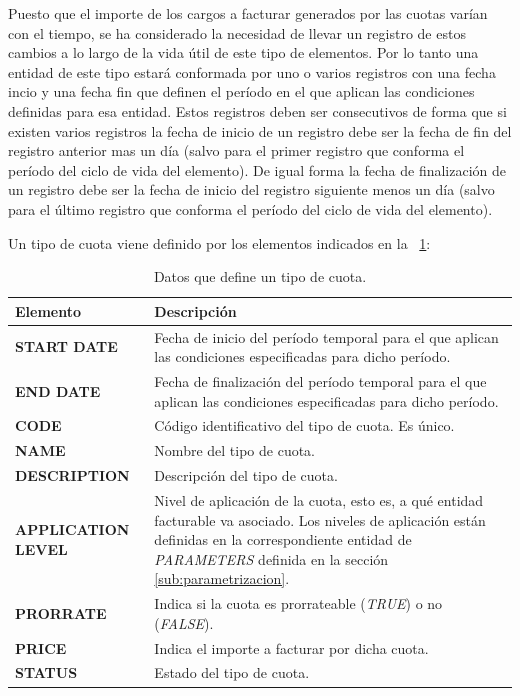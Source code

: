 Puesto que el importe de los cargos a facturar generados por las cuotas varían con el tiempo, se ha considerado la necesidad de llevar un registro de estos cambios a lo largo de la vida útil de este tipo de elementos. Por lo tanto una entidad de este tipo estará conformada por uno o varios registros con una fecha incio y una fecha fin que definen el período en el que aplican las condiciones definidas para esa entidad. Estos registros deben ser consecutivos de forma que si existen varios registros la fecha de inicio de un registro debe ser la fecha de fin del registro anterior mas un día (salvo para el primer registro que conforma el período del ciclo de vida del elemento). De igual forma la fecha de finalización de un registro debe ser la fecha de inicio del registro siguiente menos un día (salvo para el último registro que conforma el período del ciclo de vida del elemento).


Un tipo de cuota viene definido por los elementos indicados en la \tablename~\ref{tab:tipo-cuota}:




\begin{table}[H]
  \centering
  \setlength{\leftmargini}{0.4cm}
  \resizebox{14cm}{!} {
  \begin{tabular}{|m{3cm} m{11cm}|}
  \rowcolor{udcpink!25}
  \hline
  	\textbf{Elemento} & \textbf{Descripción} \\\hline
  	\textbf{START DATE} & Fecha de inicio del período temporal para el que aplican las condiciones especificadas para dicho período.\\
  	\textbf{END DATE} & Fecha de finalización del período temporal para el que aplican las condiciones especificadas para dicho período.\\
  	\textbf{CODE} & Código identificativo del tipo de cuota. Es único.\\
	\textbf{NAME} & Nombre del tipo de cuota.\\
	\textbf{DESCRIPTION} & Descripción del tipo de cuota.\\
	\textbf{APPLICATION LEVEL} & Nivel de aplicación de la cuota, esto es, a qué entidad facturable va asociado. Los niveles de aplicación están definidas en la correspondiente entidad de \emph{PARAMETERS} definida en la sección \ref{sub:parametrizacion}.\\	
	\textbf{PRORRATE} & Indica si la cuota es prorrateable (\textit{TRUE}) o no (\textit{FALSE}).\\
	\textbf{PRICE} & Indica el importe a facturar por dicha cuota.\\
	\textbf{STATUS} & Estado del tipo de cuota.	
	\\\hline
  \end{tabular}
  } %
  \caption{Datos que define un tipo de cuota.}
  \label{tab:tipo-cuota}
\end{table}




